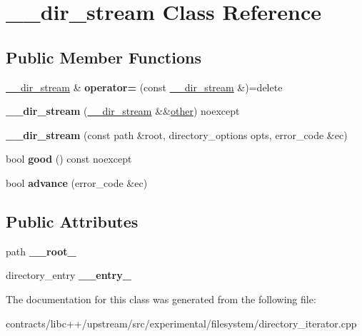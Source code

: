 \hypertarget{class____dir__stream}{}\section{\+\_\+\+\_\+dir\+\_\+stream Class Reference}
\label{class____dir__stream}
\subsection*{Public Member Functions}
\begin{DoxyCompactItemize}
\item 
\mbox{\label{class____dir__stream_aa71507542c456bdf69211c4f30df50b6}} 
\mbox{\hyperlink{class____dir__stream}{\+\_\+\+\_\+dir\+\_\+stream}} \& {\bfseries operator=} (const \mbox{\hyperlink{class____dir__stream}{\+\_\+\+\_\+dir\+\_\+stream}} \&)=delete
\item 
\mbox{\label{class____dir__stream_a97f8bd14aecb100bfacc55d4bc56f84d}} 
{\bfseries \+\_\+\+\_\+dir\+\_\+stream} (\mbox{\hyperlink{class____dir__stream}{\+\_\+\+\_\+dir\+\_\+stream}} \&\&\mbox{\hyperlink{structother}{other}}) noexcept
\item 
\mbox{\label{class____dir__stream_a10c7b4b3e26eceeecc4cf23ed7f32c3c}} 
{\bfseries \+\_\+\+\_\+dir\+\_\+stream} (const path \&root, directory\+\_\+options opts, error\+\_\+code \&ec)
\item 
\mbox{\label{class____dir__stream_ac697536083928fd9d65b9802437fa79c}} 
bool {\bfseries good} () const noexcept
\item 
\mbox{\label{class____dir__stream_a3e0abd8a5bcfa874d6614d8d03a0408d}} 
bool {\bfseries advance} (error\+\_\+code \&ec)
\end{DoxyCompactItemize}
\subsection*{Public Attributes}
\begin{DoxyCompactItemize}
\item 
\mbox{\label{class____dir__stream_a4d6b3d5ac01113fd961b5c1b49ded211}} 
path {\bfseries \+\_\+\+\_\+root\+\_\+}
\item 
\mbox{\label{class____dir__stream_aca1d48bffe267eace3ce85a67bfd2eb6}} 
directory\+\_\+entry {\bfseries \+\_\+\+\_\+entry\+\_\+}
\end{DoxyCompactItemize}


The documentation for this class was generated from the following file\+:\begin{DoxyCompactItemize}
\item 
contracts/libc++/upstream/src/experimental/filesystem/directory\+\_\+iterator.\+cpp\end{DoxyCompactItemize}

